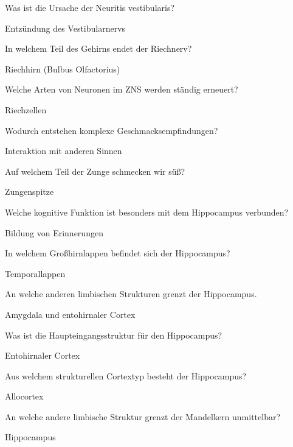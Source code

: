 \documentclass[10pt, a4paper]{exam}
\newcommand\Warning{%
 \makebox[1.4em][c]{%
 \makebox[0pt][c]{\raisebox{.1em}{\small!}}%
 \makebox[0pt][c]{\color{red}\Large$\bigtriangleup$}}}%
\begin{document}
\begin{questions}
  \question Was ist die Ursache der Neuritis vestibularis?
  \begin{solution}
    Entzündung des Vestibularnervs
  \end{solution}

  \question In welchem Teil des Gehirns endet der Riechnerv?
  \begin{solution}
    Riechhirn (Bulbus Olfactorius)
  \end{solution}

  \question Welche Arten von Neuronen im ZNS werden ständig erneuert?
  \begin{solution}
    Riechzellen
  \end{solution}

  \question Wodurch entstehen komplexe Geschmacksempfindungen?
  \begin{solution}
    Interaktion mit anderen Sinnen
  \end{solution}

  \question Auf welchem Teil der Zunge schmecken wir süß?
  \begin{solution}
    Zungenspitze
  \end{solution}

  \question Welche kognitive Funktion ist besonders mit dem Hippocampus verbunden?
  \begin{solution}
    Bildung von Erinnerungen
  \end{solution}

  \question In welchem Großhirnlappen befindet sich der Hippocampus?
  \begin{solution}
    Temporallappen
  \end{solution}

  \question An welche anderen limbischen Strukturen grenzt der Hippocampus.
  \begin{solution}
    Amygdala und entohirnaler Cortex
  \end{solution}

  \question Was ist die Haupteingangsstruktur für den Hippocampus?
  \begin{solution}
    Entohirnaler Cortex
  \end{solution}

  \question Aus welchem strukturellen Cortextyp besteht der Hippocampus?
  \begin{solution}
    Allocortex
  \end{solution}

  \question An welche andere limbische Struktur grenzt der Mandelkern unmittelbar?
  \begin{solution}
    Hippocampus \Warning
  \end{solution}


\end{questions}
\end{document}
